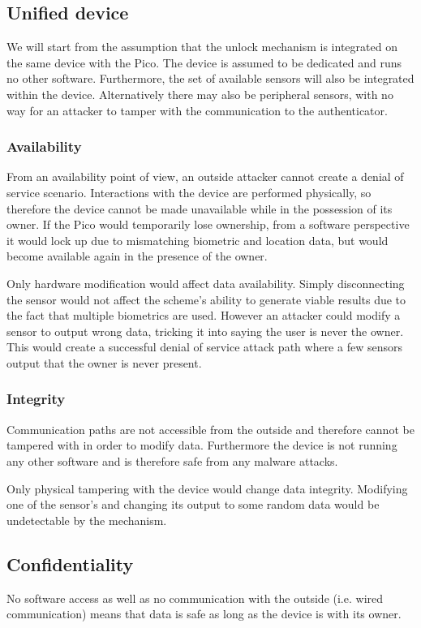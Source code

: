 \subsection{Unified device}
We will start from the assumption that the unlock mechanism is integrated on the same device with the Pico. The device is assumed to be dedicated and runs no other software. Furthermore, the set of available sensors will also be integrated within the device. Alternatively there may also be peripheral sensors, with no way for an attacker to tamper with the communication to the authenticator. 

	\subsubsection*{Availability}
	From an availability point of view, an outside attacker cannot create a denial of service scenario. Interactions with the device are performed physically, so therefore the device cannot be made unavailable while in the possession of its owner. If the Pico would temporarily lose ownership, from a software perspective it would lock up due to mismatching biometric and location data, but would become available again in the presence of the owner. 
	
	Only hardware modification would affect data availability. Simply disconnecting the sensor would not affect the scheme's ability to generate viable results due to the fact that multiple biometrics are used. However an attacker could modify a sensor to output wrong data, tricking it into saying the user is never the owner. This would create a successful denial of service attack path where a few sensors output that the owner is never present. 
	
	\subsubsection*{Integrity}
	Communication paths are not accessible from the outside and therefore cannot be tampered with in order to modify data. Furthermore the device is not running any other software and is therefore safe from any malware attacks. 
	
	Only physical tampering with the device would change data integrity. Modifying one of the sensor's and changing its output to some random data would be undetectable by the mechanism. 
	
	\subsection*{Confidentiality}
	No software access as well as no communication with the outside (i.e. wired communication) means that data is safe as long as the device is with its owner.
	
